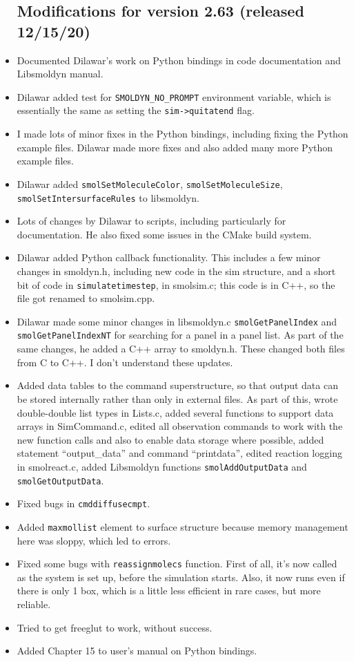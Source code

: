 \documentclass {scrbook}
\newcommand {\ttt} {\texttt}
\begin{document}
\begin{itemize}
\subsection*{Modifications for version 2.63 (released 12/15/20)}
\item Documented Dilawar's work on Python bindings in code documentation and Libsmoldyn manual.
\item Dilawar added test for \ttt{SMOLDYN\_NO\_PROMPT} environment variable, which is essentially the same as setting the \ttt{sim->quitatend} flag.
\item I made lots of minor fixes in the Python bindings, including fixing the Python example files. Dilawar made more fixes and also added many more Python example files.
\item Dilawar added \ttt{smolSetMoleculeColor}, \ttt{smolSetMoleculeSize}, \ttt{smolSetIntersurfaceRules} to libsmoldyn.
\item Lots of changes by Dilawar to scripts, including particularly for documentation. He also fixed some issues in the CMake build system.
\item Dilawar added Python callback functionality. This includes a few minor changes in smoldyn.h, including new code in the sim structure, and a short bit of code in \ttt{simulatetimestep}, in smolsim.c; this code is in C++, so the file got renamed to smolsim.cpp.
\item Dilawar made some minor changes in libsmoldyn.c \ttt{smolGetPanelIndex} and \ttt{smolGetPanelIndexNT} for searching for a panel in a panel list. As part of the same changes, he added a C++ array to smoldyn.h. These changed both files from C to C++. I don't understand these updates.
\item Added data tables to the command superstructure, so that output data can be stored internally rather than only in external files. As part of this, wrote double-double list types in Lists.c, added several functions to support data arrays in SimCommand.c, edited all observation commands to work with the new function calls and also to enable data storage where possible, added statement ``output\_data'' and command ``printdata'', edited reaction logging in smolreact.c, added Libsmoldyn functions \ttt{smolAddOutputData} and \ttt{smolGetOutputData}.
\item Fixed bugs in \ttt{cmddiffusecmpt}.
\item Added \ttt{maxmollist} element to surface structure because memory management here was sloppy, which led to errors.
\item Fixed some bugs with \ttt{reassignmolecs} function. First of all, it's now called as the system is set up, before the simulation starts. Also, it now runs even if there is only 1 box, which is a little less efficient in rare cases, but more reliable.
\item Tried to get freeglut to work, without success.
\item Added Chapter 15 to user's manual on Python bindings.


\end{itemize}
\end{document}
